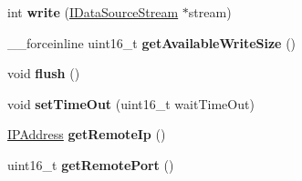 \begin{DoxyCompactItemize}
\item 
\hypertarget{class_tcp_connection_a59ef4474eb3d65f8b1f1e21e0f3f3c25}{}int {\bfseries write} (\hyperlink{class_i_data_source_stream}{I\+Data\+Source\+Stream} $\ast$stream)\label{class_tcp_connection_a59ef4474eb3d65f8b1f1e21e0f3f3c25}

\item 
\hypertarget{class_tcp_connection_ab8d1467ac2d76882be7ec74f0aa0e1bf}{}\+\_\+\+\_\+forceinline uint16\+\_\+t {\bfseries get\+Available\+Write\+Size} ()\label{class_tcp_connection_ab8d1467ac2d76882be7ec74f0aa0e1bf}

\item 
\hypertarget{class_tcp_connection_aaaa45b0c9a0b26df7f8ca79697785114}{}void {\bfseries flush} ()\label{class_tcp_connection_aaaa45b0c9a0b26df7f8ca79697785114}

\item 
\hypertarget{class_tcp_connection_a3d01ef17727966d8d63e6f35a2a0fd14}{}void {\bfseries set\+Time\+Out} (uint16\+\_\+t wait\+Time\+Out)\label{class_tcp_connection_a3d01ef17727966d8d63e6f35a2a0fd14}

\item 
\hypertarget{class_tcp_connection_a333a64364cd35ef53615bd52b9918825}{}\hyperlink{class_i_p_address}{I\+P\+Address} {\bfseries get\+Remote\+Ip} ()\label{class_tcp_connection_a333a64364cd35ef53615bd52b9918825}

\item 
\hypertarget{class_tcp_connection_ad6fedbbb90a1147bde5b143fd8fdde6f}{}uint16\+\_\+t {\bfseries get\+Remote\+Port} ()\label{class_tcp_connection_ad6fedbbb90a1147bde5b143fd8fdde6f}

\end{DoxyCompactItemize}
